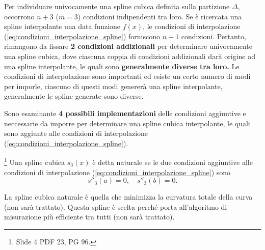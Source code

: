 Per individuare univocamente una spline cubica definita sulla partizione $\Delta$, occorrono $n+3$ ($m=3$) condizioni indipendenti tra loro. Se è ricercata una spline interpolante una data funzione $f(x)$, le condizioni di interpolazione (\ref{eq:condizioni_interpolazione_spline}) forniscono $n+1$ condizioni. Pertanto, rimangono da fissare \textbf{2 condizioni addizionali} per determinare univocamente una spline cubica, dove ciascuna coppia di condizioni addizionali darà origine ad una spline interpolante, le quali sono \textbf{generalmente diverse tra loro.} Le condizioni di interpolazione sono importanti ed esiste un certo numero di modi per imporle, ciascuno di questi modi genererà una spline interpolante, generalmente le spline generate sono diverse.

Sono esaminante \textbf{4 possibili implementazioni} delle condizioni aggiuntive e neccessarie da imporre per determinare una spline cubica interpolante, le quali sono aggiunte alle condizioni di interpolazione (\ref{eq:condizioni_interpolazione_spline}).
\begin{definition}
	\footnote{Slide 4 PDF 23, PG 96.} Una spline cubica $s_3(x)$ è detta naturale se le due condizioni aggiuntive alle condizioni di interpolazione (\ref{eq:condizioni_interpolazione_spline}) sono
	\begin{equation}\label{eq:condizioni_spline_cubica_naturale}
    \boxed{s''_3(a)=0,\quad s''_3(b)=0.}
\end{equation}
\end{definition}

La spline cubica naturale è quella che minimizza la curvatura totale della curva (non sarà trattato). Questa spline è scelta perché porta all'algoritmo di misurazione più efficiente tra tutti (non sarà trattato).

